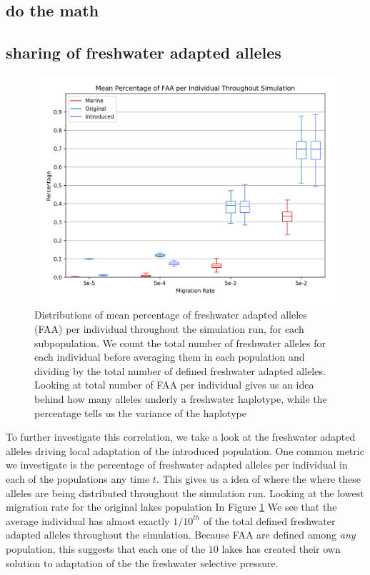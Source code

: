 \documentclass{article}
\newcommand{\jgg}[1]{\todo[linecolor=green,backgroundcolor=green!25,bordercolor=black]{#1}}
\begin{document}
\subsection*{do the math}
\jgg{peter? :)}

 
\subsection*{sharing of freshwater adapted alleles}

\begin{figure}
	\begin{center}
  		\includegraphics[width=\linewidth]{matplotlibPlots/MPFAI.png}
  		\caption{Distributions of mean percentage of freshwater adapted alleles (FAA) per individual throughout the simulation run, for each subpopulation.
		We count the total number of freshwater alleles for each individual before averaging them in each population and dividing by the total number of defined
		freshwater adapted alleles.
		Looking at total number of FAA per individual gives us an idea behind how many alleles underly a freshwater haplotype, 
		while the percentage tells us the variance of the haplotype}
		\label{fig:MPFAI}
	\end{center}
\end{figure}

To further investigate this correlation, we take a look at the freshwater adapted alleles driving 
local adaptation of the introduced population. 
One common metric we investigate is the percentage of freshwater adapted alleles per individual in each of the populations any time $t$. 
This gives us a idea of where the where these alleles are being distributed throughout the simulation run. 
Looking at the lowest migration rate for the original lakes population In Figure \ref{fig:MPFAI}
We see that the average individual has almost exactly $1/10^{th}$ of the total defined freshwater adapted alleles throughout the simulation. 
Because FAA are defined among \textit{any} population, this suggests that each one of the $10$ 
lakes has created their own solution to adaptation of the the freshwater selective pressure. 
\end{document}
